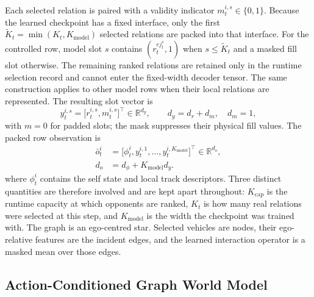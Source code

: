 \documentclass[journal]{IEEEtran}
\begin{document}
Each selected relation is paired with a validity indicator $m_t^{i,s}\in\{0,1\}$.
Because the learned checkpoint has a fixed interface, only the first
$\widetilde K_t=\min(K_t,K_{\mathrm{model}})$ selected relations are packed
into that interface. For the controlled row, model slot $s$ contains
$(r_t^{e j_t^s},1)$ when $s\le\widetilde K_t$ and a masked fill slot
otherwise. The remaining ranked relations are retained only in the runtime
selection record and cannot enter the fixed-width decoder tensor.
The same construction applies to other model rows when their local relations
are represented. The resulting slot vector is
\begin{equation}
 y_t^{i,s}=\bigl[r_t^{i,s},m_t^{i,s}\bigr]^\top\in\mathbb R^{d_y},\qquad d_y=d_r+d_m,\quad d_m=1,
\label{eq:relation_slot}
\end{equation}
with $m=0$ for padded slots; the mask suppresses their physical fill values. The packed
row observation is
\begin{equation}
\begin{aligned}
\bar o_t^i&=\bigl[\phi_t^i,y_t^{i,1},\ldots,y_t^{i,K_{\mathrm{model}}}\bigr]^\top\in\mathbb R^{d_o},\\
d_o&=d_\phi+K_{\mathrm{model}}d_y.
\end{aligned}
\label{eq:packed_observation}
\end{equation}
where $\phi_t^i$ contains the self state and local track descriptors. Three
distinct quantities are therefore involved and are kept apart throughout:
$K_{\mathrm{cap}}$ is the runtime capacity at which
opponents are ranked, $K_t$ is how many real relations were selected at this
step, and $K_{\mathrm{model}}$ is the width the checkpoint was trained with.
The graph is an ego-centred star. Selected vehicles are nodes, their
ego-relative features are the incident edges, and the learned interaction
operator is a masked mean over those edges.

\subsection{Action-Conditioned Graph World Model}
\label{subsec:world_model}
\end{document}
